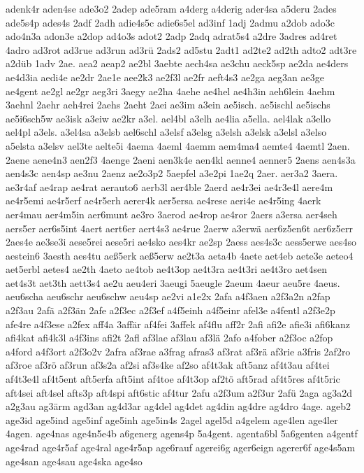 {adenk4r
aden4se
ade3o2
2adep
ade5ram
a4derg
a4derig
ader4sa
a5deru
2ades
ade5s4p
ades4s
2adf
2adh
adie4s5c
adie6s5el
ad3inf
1adj
2admu
a2dob
ado3c
ado4n3a
adon3e
a2dop
ad4o3s
adot2
2adp
2adq
adrat5s4
a2dre
3adres
ad4ret
4adro
ad3rot
ad3rue
ad3run
ad3rü
2ads2
ad5stu
2adt1
ad2te2
ad2th
adto2
adt3re
a2düb
1adv
2ae.
aea2
aeap2
ae2bl
3aebte
aech4sa
ae3chu
aeck5sp
ae2da
ae4ders
ae4d3ia
aedi4e
ae2dr
2ae1e
aee2k3
ae2f3l
ae2fr
aeft4s3
ae2ga
aeg3an
ae3ge
ae4gent
ae2gl
ae2gr
aeg3ri
3aegy
ae2ha
4aehe
ae4hel
ae4h3in
aeh6lein
4aehm
3aehnl
2aehr
aeh4rei
2aehs
2aeht
2aei
ae3im
a3ein
ae5isch.
ae5ischl
ae5ischs
ae5i6sch5w
ae3isk
a3eiw
ae2kr
a3el.
ael4bl
a3elh
ae4lia
a5ella.
ael4lak
a3ello
ael4pl
a3els.
a3el4sa
a3elsb
ael6schl
a3elsf
a3elsg
a3elsh
a3elsk
a3elsl
a3elso
a5elsta
a3elsv
ael3te
aelte5i
4aema
4aeml
4aemm
aem4ma4
aemte4
4aemtl
2aen.
2aene
aene4n3
aen2f3
4aenge
2aeni
aen3k4e
aen4kl
aenne4
aenner5
2aens
aen4s3a
aen4s3c
aen4sp
ae3nu
2aenz
ae2o3p2
5aepfel
a3e2pi
1ae2q
2aer.
aer3a2
3aera.
ae3r4af
ae4rap
ae4rat
aerauto6
aerb3l
aer4ble
2aerd
ae4r3ei
ae4r3e4l
aere4m
ae4r5emi
ae4r5erf
ae4r5erh
aerer4k
aer5ersa
ae4rese
aeri4e
ae4r5ing
4aerk
aer4mau
aer4m5in
aer6munt
ae3ro
3aerod
ae4rop
ae4ror
2aers
a3ersa
aer4seh
aers5er
aer6s5int
4aert
aert6er
aert4s3
ae4rue
2aerw
a3erwä
aer6z5en6t
aer6z5err
2aes4e
ae3se3i
aese5rei
aese5ri
ae4sko
aes4kr
ae2sp
2aess
aes4s3c
aess5erwe
aes4so
aestein6
3aesth
aes4tu
aeß5erk
aeß5erw
ae2t3a
aeta4b
4aete
aet4eb
aete3e
aeteo4
aet5erbl
aetes4
ae2th
4aeto
ae4tob
ae4t3op
ae4t3ra
ae4t3ri
ae4t3ro
aet4sen
aet4s3t
aet3th
aett3s4
ae2u
aeu4eri
3aeugi
5aeugle
2aeum
4aeur
aeu5re
4aeus.
aeu6scha
aeu6schr
aeu6schw
aeu4sp
ae2vi
a1e2x
2afa
a4f3aen
a2f3a2n
a2fap
a2f3au
2afä
a2f3än
2afe
a2f3ec
a2f3ef
a4f5einh
a4f5einr
afel3e
a4fentl
a2f3e2p
afe4re
a4f3ese
a2fex
aff4a
3affär
af4fei
3affek
af4flu
aff2r
2afi
afi2e
afie3i
afi6kanz
afi4kat
afi4k3l
a4f3ins
afi2t
2afl
af3lae
af3lau
af3lä
2afo
a4fober
a2f3oc
a2fop
a4ford
a4f3ort
a2f3o2v
2afra
af3rae
a3frag
afras3
af3rat
af3rä
af3rie
a3fris
2af2ro
af3roe
af3rö
af3run
af3s2a
af2si
af3s4ke
af2so
af4t3ak
aft5anz
af4t3au
af4tei
af4t3e4l
af4t5ent
aft5erfa
aft5int
af4toe
af4t3op
af2tö
aft5rad
af4t5res
af4t5ric
aft4sei
aft4sel
afts3p
aft4spi
aft6stic
af4tur
2afu
a2f3um
a2f3ur
2afü
2aga
ag3a2d
a2g3au
ag3ärm
agd3an
ag4d3ar
ag4del
ag4det
ag4din
ag4dre
ag4dro
4age.
ageb2
age3id
age5ind
age5inf
age5inh
age5in4s
2agel
agel5d
a4gelem
age4len
age4ler
4agen.
age4nas
age4n5e4b
a6generg
agens4p
5a4gent.
agenta6bl
5a6genten
a4gentf
age4rad
age4r5af
age4ral
age4r5ap
age6rauf
agerei6g
ager6eign
agerer6f
age4s5am
age4san
age4sau
age4ska
age4so
}
